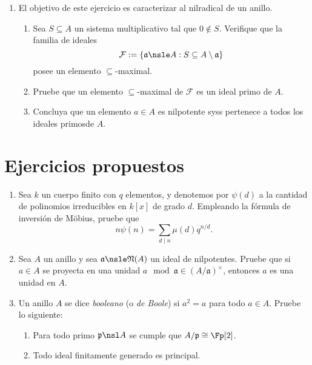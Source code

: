 \documentclass[11pt, reqno]{amsart}
\begin{document}
\begin{enumerate}
	\item El objetivo de este ejercicio es caracterizar al nilradical de un anillo.
		\begin{enumerate}
			\item Sea $S \subseteq A$ un sistema multiplicativo tal que $0 \notin S$.
				Verifique que la familia de ideales
				\[
					\mathcal{F} := \{ \mathfrak{a} \nsle A : S \subseteq A \setminus \mathfrak{a} \}
				\]
				posee un elemento $\subseteq$-maximal.
			\item Pruebe que un elemento $\subseteq$-maximal de $\mathcal{F}$ es un ideal primo de $A$.
			\item Concluya que un elemento $a \in A$ es nilpotente syss pertenece a todos los ideales
				primos\break de $A$.
		\end{enumerate}

\end{enumerate}

\appendix
\section{Ejercicios propuestos}
\begin{enumerate}
	\item Sea $k$ un cuerpo finito con $q$ elementos, y denotemos por $\psi(d)$ a la cantidad de polinomios
		irreducibles en $k[x]$ de grado $d$.
		Empleando la fórmula de inversión de Möbius, pruebe que
		\[
			n \psi(n) = \sum_{d \mid n} \mu(d)q^{n/d}.
		\]
	\item Sea $A$ un anillo y sea $\mathfrak{a} \nsle \mathfrak{N}(A)$ un ideal de nilpotentes.
		Pruebe que si $a \in A$ se proyecta en una unidad $a \mod{\mathfrak{a}} \in (A/\mathfrak{a})^\times$,
		entonces $a$ es una unidad en $A$.
	\item\label{bool_ring}
		Un anillo $A$ se dice \emph{booleano} (o \emph{de Boole}) si $a^2 = a$ para todo $a \in A$.
		Pruebe lo siguiente:
		\begin{enumerate}
			\item Para todo primo $\mathfrak{p} \nsl A$ se cumple que $A/\mathfrak{p} \cong \Fp[2]$.
			\item Todo ideal finitamente generado es principal.
		\end{enumerate}
\end{enumerate}
\end{document}
